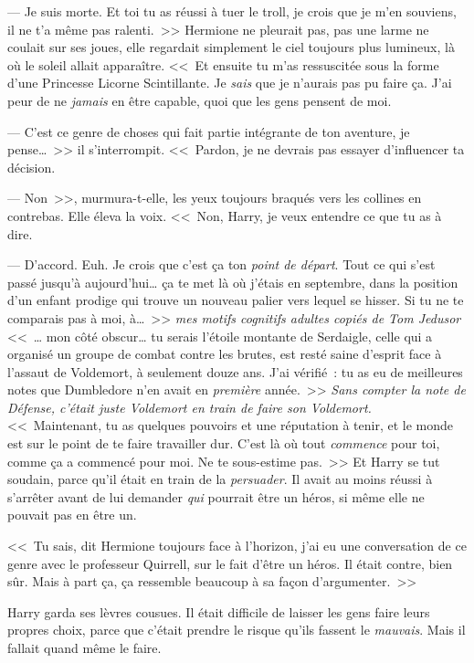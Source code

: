 --- Je suis morte. Et toi tu as réussi à tuer le troll, je crois que je m'en souviens, il ne t'a même pas ralenti.~>> Hermione ne pleurait pas, pas une larme ne coulait sur ses joues, elle regardait simplement le ciel toujours plus lumineux, là où le soleil allait apparaître. <<~Et ensuite tu m'as ressuscitée sous la forme d'une Princesse Licorne Scintillante. Je \emph{sais} que je n'aurais pas pu faire ça. J'ai peur de ne \emph{jamais} en être capable, quoi que les gens pensent de moi.

--- C'est ce genre de choses qui fait partie intégrante de ton aventure, je pense…~>> il s'interrompit. <<~Pardon, je ne devrais pas essayer d'influencer ta décision.

--- Non~>>, murmura-t-elle, les yeux toujours braqués vers les collines en contrebas. Elle éleva la voix. <<~Non, Harry, je veux entendre ce que tu as à dire.

--- D'accord. Euh. Je crois que c'est ça ton \emph{point de départ}. Tout ce qui s'est passé jusqu'à aujourd'hui… ça te met là où j'étais en septembre, dans la position d'un enfant prodige qui trouve un nouveau palier vers lequel se hisser. Si tu ne te comparais pas à moi, à…~>> \emph{mes motifs cognitifs adultes copiés de Tom Jedusor} <<~… mon côté obscur… tu serais l'étoile montante de Serdaigle, celle qui a organisé un groupe de combat contre les brutes, est resté saine d'esprit face à l'assaut de Voldemort, à seulement douze ans. J'ai vérifié~: tu as eu de meilleures notes que Dumbledore n'en avait en \emph{première} année.~>> \emph{Sans compter la note de Défense, c'était juste Voldemort en train de faire son Voldemort.} <<~Maintenant, tu as quelques pouvoirs et une réputation à tenir, et le monde est sur le point de te faire travailler dur. C'est là où tout \emph{commence} pour toi, comme ça a commencé pour moi. Ne te sous-estime pas.~>> Et Harry se tut soudain, parce qu'il était en train de la \emph{persuader}. Il avait au moins réussi à s'arrêter avant de lui demander \emph{qui} pourrait être un héros, si même elle ne pouvait pas en être un.

<<~Tu sais, dit Hermione toujours face à l'horizon, j'ai eu une conversation de ce genre avec le professeur Quirrell, sur le fait d'être un héros. Il était contre, bien sûr. Mais à part ça, ça ressemble beaucoup à sa façon d'argumenter.~>>

Harry garda ses lèvres cousues. Il était difficile de laisser les gens faire leurs propres choix, parce que c'était prendre le risque qu'ils fassent le \emph{mauvais}. Mais il fallait quand même le faire.

